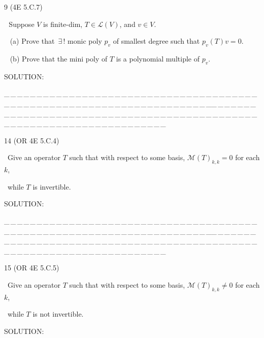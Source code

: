 \documentclass[a4paper, 11pt, UTF8]{article}
\def\Lm{\mathcal{L}}
\def\Mt{\mathcal{M}}
\begin{document}
\begin{large}
{\timesbf\Large 9} ({\normalsize4E 5.C.7})\par\,\, {\timessl\Large 
Suppose $V$ is finite-dim, $T\in \Lm(V)$, and $v \in V$.
}\par\,\,\,
(a) {\timessl\Large
Prove that $\,\exists\,!$ monic poly $p_v$ of smallest degree such that $p_v (T)v = 0$.
}\par\,\,\,
(b) {\timessl\Large
Prove that the mini poly of $T$ is a polynomial multiple of $p_v$.
}\par
{\timesbf S\footnotesize{OLUTION:}}\par\quad

\par
{\tiny \_\,\_\,\_\,\_\,\_\,\_\,\_\,\_\,\_\,\_\,\_\,\_\,\_\,\_\,\_\,\_\,\_\,\_\,\_\,\_\,\_\,\_\,\_\,\_\,\_\,\_\,\_\,\_\,\_\,\_\,\_\,\_\,\_\,\_\,\_\,\_\,\_\,\_\,\_\,\_\,\_\,\_\,\_\,\_\,\_\,\_\,\_\,\_\,\_\,\_\,\_\,\_\,\_\,\_\,\_\,\_\,\_\,\_\,\_\,\_\,\_\,\_\,\_\,\_\,\_\,\_\,\_\,\_\,\_\,\_\,\_\_\,\_\,\_\,\_\,\_\,\_\,\_\,\_\,\_\,\_\,\_\,\_\,\_\,\_\,\_\,\_\,\_\,\_\,\_\,\_\,\_\,\_\,\_\,\_\,\_\,\_\,\_\,\_\,\_\,\_\,\_\,\_\,\_\,\_\,\_\,\_\,\_\,\_\,\_\,\_\,\_\,\_\,\_\,\_\,\_\,\_\,\_\,\_\,\_\,\_\,\_\,\_\,\_\,\_\,\_\,\_\,\_\,\_\,\_\,\_\,\_\,\_\,\_\,\_\,\_\,\_\,\_\,\_\,\_\,\_\,\_}\par


{\timesbf\Large 14} ({\normalsize O{\small R} 4E 5.C.4})\par\quad\, {\timessl\Large 
Give an operator $T$ such that with respect to some basis, $\Mt(T)_{k,k}=0$ for each $k$,}\par\quad\,
{\timessl\Large while $T$ is invertible.
}\par
{\timesbf S\footnotesize{OLUTION:}}\par\quad

\par
{\tiny \_\,\_\,\_\,\_\,\_\,\_\,\_\,\_\,\_\,\_\,\_\,\_\,\_\,\_\,\_\,\_\,\_\,\_\,\_\,\_\,\_\,\_\,\_\,\_\,\_\,\_\,\_\,\_\,\_\,\_\,\_\,\_\,\_\,\_\,\_\,\_\,\_\,\_\,\_\,\_\,\_\,\_\,\_\,\_\,\_\,\_\,\_\,\_\,\_\,\_\,\_\,\_\,\_\,\_\,\_\,\_\,\_\,\_\,\_\,\_\,\_\,\_\,\_\,\_\,\_\,\_\,\_\,\_\,\_\,\_\,\_\_\,\_\,\_\,\_\,\_\,\_\,\_\,\_\,\_\,\_\,\_\,\_\,\_\,\_\,\_\,\_\,\_\,\_\,\_\,\_\,\_\,\_\,\_\,\_\,\_\,\_\,\_\,\_\,\_\,\_\,\_\,\_\,\_\,\_\,\_\,\_\,\_\,\_\,\_\,\_\,\_\,\_\,\_\,\_\,\_\,\_\,\_\,\_\,\_\,\_\,\_\,\_\,\_\,\_\,\_\,\_\,\_\,\_\,\_\,\_\,\_\,\_\,\_\,\_\,\_\,\_\,\_\,\_\,\_\,\_\,\_}\par

{\timesbf\Large 15} ({\normalsize O{\small R} 4E 5.C.5})\par\quad\, {\timessl\Large 
Give an operator $T$ such that with respect to some basis, $\Mt(T)_{k,k}\neq 0$ for each $k$,}\par\quad\,
{\timessl\Large while $T$ is not invertible.
}\par
{\timesbf S\footnotesize{OLUTION:}}\par\quad


\end{large}
\end{document}
